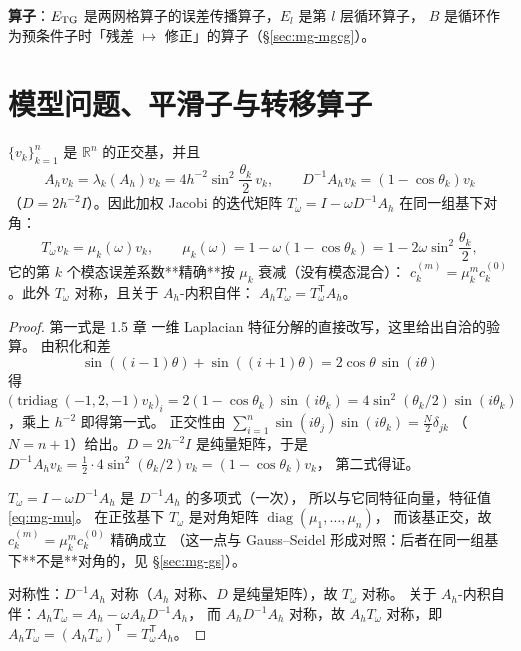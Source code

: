 \textbf{算子}：$E_{\rm TG}$ 是两网格算子的误差传播算子，$E_l$ 是第 $l$ 层循环算子，
$B$ 是循环作为预条件子时「残差 $\mapsto$ 修正」的算子（\S\ref{sec:mg-mgcg}）。

\section{模型问题、平滑子与转移算子}
\label{sec:mg-setting}

\begin{theorem}
\label{thm:mg-spectrum}
$\{v_k\}_{k=1}^{n}$ 是 $\mathbb R^n$ 的正交基，并且
\begin{equation}
  A_hv_k=\lambda_k(A_h)v_k=4h^{-2}\sin^2\frac{\theta_k}{2}\,v_k,
  \qquad
  D^{-1}A_hv_k=(1-\cos\theta_k)v_k
  \label{eq:mg-sine}
\end{equation}
（$D=2h^{-2}I$）。因此加权 Jacobi 的迭代矩阵 $T_\omega=I-\omega D^{-1}A_h$
在同一组基下对角：
\begin{equation}
  T_\omega v_k=\mu_k(\omega)v_k,\qquad
  \mu_k(\omega)=1-\omega(1-\cos\theta_k)=1-2\omega\sin^2\frac{\theta_k}{2},
  \label{eq:mg-mu}
\end{equation}
它的第 $k$ 个模态误差系数**精确**按 $\mu_k$ 衰减（没有模态混合）：
$c_k^{(m)}=\mu_k^m c_k^{(0)}$。此外 $T_\omega$ 对称，且关于 $A_h$-内积自伴：
$A_hT_\omega=T_\omega^{\mathsf T}A_h$。
\end{theorem}

\begin{proof}
第一式是 1.5 章 一维 Laplacian 特征分解的直接改写，这里给出自洽的验算。
由积化和差
\begin{equation}
  \sin((i-1)\theta)+\sin((i+1)\theta)=2\cos\theta\,\sin(i\theta)
\end{equation}
得 $\bigl(\operatorname{tridiag}(-1,2,-1)v_k\bigr)_i=2(1-\cos\theta_k)\sin(i\theta_k)
=4\sin^2(\theta_k/2)\sin(i\theta_k)$，乘上 $h^{-2}$ 即得第一式。
正交性由 $\sum_{i=1}^{n}\sin(i\theta_j)\sin(i\theta_k)=\frac{N}{2}\delta_{jk}$
（$N=n+1$）给出。$D=2h^{-2}I$ 是纯量矩阵，于是
$D^{-1}A_hv_k=\frac12\cdot 4\sin^2(\theta_k/2)v_k=(1-\cos\theta_k)v_k$，
第二式得证。

$T_\omega=I-\omega D^{-1}A_h$ 是 $D^{-1}A_h$ 的多项式（一次），
所以与它同特征向量，特征值 \eqref{eq:mg-mu}。
在正弦基下 $T_\omega$ 是对角矩阵 $\operatorname{diag}(\mu_1,\dots,\mu_n)$，
而该基正交，故 $c_k^{(m)}=\mu_k^mc_k^{(0)}$ 精确成立
（这一点与 Gauss--Seidel 形成对照：后者在同一组基下**不是**对角的，见 \S\ref{sec:mg-gs}）。

对称性：$D^{-1}A_h$ 对称（$A_h$ 对称、$D$ 是纯量矩阵），故 $T_\omega$ 对称。
关于 $A_h$-内积自伴：$A_hT_\omega=A_h-\omega A_hD^{-1}A_h$，
而 $A_hD^{-1}A_h$ 对称，故 $A_hT_\omega$ 对称，即
$A_hT_\omega=(A_hT_\omega)^{\mathsf T}=T_\omega^{\mathsf T}A_h$。
\end{proof}

